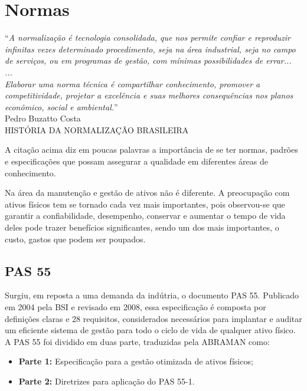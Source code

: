 \section{Normas}

\begin{flushright}
	“\textit{A normalização é tecnologia consolidada, que nos
permite confiar e reproduzir infinitas vezes determinado
procedimento, seja na área industrial, seja no campo de
serviços, ou em programas de gestão, com mínimas
possibilidades de errar...
\\
...
\\
Elaborar uma norma técnica é compartilhar
conhecimento, promover a competitividade, projetar a
excelência e suas melhores consequências nos planos
econômico, social e ambiental.}”
\\
Pedro Buzatto Costa
\\
HISTÓRIA DA NORMALIZAÇÃO BRASILEIRA
\end{flushright}

A citação acima diz em poucas palavras a importância de se ter normas, padrões e especificações que possam assegurar a qualidade em diferentes áreas de conhecimento.

Na área da manutenção e gestão de ativos não é diferente. A preocupação com ativos físicos tem se tornado cada vez mais importantes, pois observou-se que garantir a confiabilidade, desempenho, conservar e aumentar o tempo de vida deles pode trazer benefícios significantes, sendo um dos mais importantes, o custo, gastos que podem ser poupados.

\subsection{PAS 55}

Surgiu, em reposta a uma demanda da indútria, o documento PAS 55. Publicado em 2004 pela BSI e revisado em 2008, essa especificação é composta por definições claras e 28 requisitos, considerados necessários para implantar e auditar um eficiente sistema de gestão para todo o ciclo de vida de qualquer ativo físico. A PAS 55 foi dividido em duas parte, traduzidas pela ABRAMAN como:

\begin{itemize}
	\item \textbf{Parte 1:} Especificação para a gestão otimizada de ativos físicos;
	\item \textbf{Parte 2:} Diretrizes para aplicação do PAS 55-1. 
\end{itemize} 

